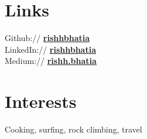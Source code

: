 \documentclass[]{deedy-resume-reversed}
\begin{document}
\begin{minipage}[t]{0.27\textwidth}

\section{Links}
Github:// \href{https://github.com/rishhbhatia}{\bf rishhbhatia} \\
LinkedIn://  \href{linkedin.com/in/rishbhatia}{\bf rishhbhatia} \\
Medium:// \href{https://medium.com/@rishh.bhatia}{\bf rishh.bhatia} \\

\sectionsep


\section{Interests}
Cooking, surfing, rock climbing, travel
\sectionsep


\end{minipage}
\end{document}

